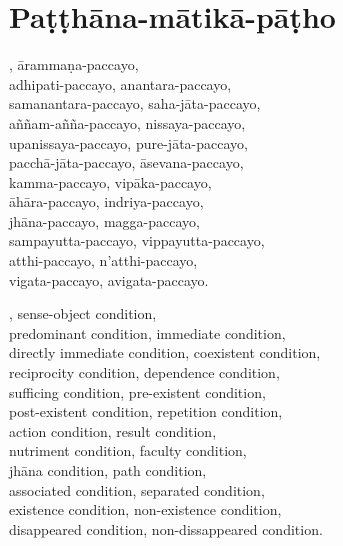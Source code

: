 \suttaRef{[SN 12.1]}

\section{Paṭṭhāna-mātikā-pāṭho}
\label{patthana-matika-patho}

\vspace{-0.8em}

\begin{pali-hang}
, ārammaṇa-paccayo,\\
adhipati-paccayo, anantara-paccayo,\\
samanantara-paccayo, saha-jāta-paccayo,\\
aññam-añña-paccayo, nissaya-paccayo,\\
upanissaya-paccayo, pure-jāta-paccayo,\\
pacchā-jāta-paccayo, āsevana-paccayo,\\
kamma-paccayo, vipāka-paccayo,\\
āhāra-paccayo, indriya-paccayo,\\
jhāna-paccayo, magga-paccayo,\\
sampayutta-paccayo, vippayutta-paccayo,\\
atthi-paccayo, n'atthi-paccayo,\\
vigata-paccayo, avigata-paccayo.
\end{pali-hang}

\begin{english-hang-verses}
  , sense-object condition,\\
  predominant condition, immediate condition,\\
  directly immediate condition, coexistent condition,\\
  reciprocity condition, dependence condition,\\
  sufficing condition, pre-existent condition,\\
  post-existent condition, repetition condition,\\
  action condition, result condition,\\
  nutriment condition, faculty condition,\\
  jhāna condition, path condition,\\
  associated condition, separated condition,\\
  existence condition, non-existence condition,\\
  disappeared condition, non-dissappeared condition.
\end{english-hang-verses}

